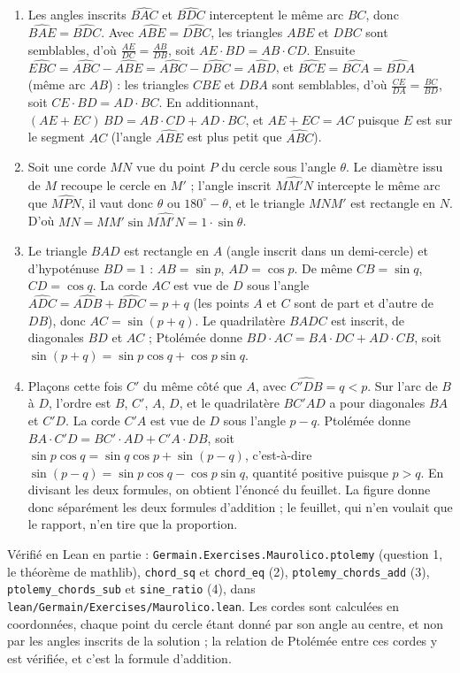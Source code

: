 \documentclass[11pt,a4paper]{article}
\begin{document}
\begin{solution}
\begin{enumerate}
\item Les angles inscrits $\widehat{BAC}$ et $\widehat{BDC}$ interceptent le même
  arc $BC$, donc $\widehat{BAE} = \widehat{BDC}$. Avec
  $\widehat{ABE} = \widehat{DBC}$, les triangles $ABE$ et $DBC$ sont semblables,
  d'où $\frac{AE}{DC} = \frac{AB}{DB}$, soit $AE \cdot BD = AB \cdot CD$. Ensuite
  $\widehat{EBC} = \widehat{ABC} - \widehat{ABE} = \widehat{ABC} - \widehat{DBC}
  = \widehat{ABD}$, et $\widehat{BCE} = \widehat{BCA} = \widehat{BDA}$ (même arc
  $AB$) : les triangles $CBE$ et $DBA$ sont semblables, d'où
  $\frac{CE}{DA} = \frac{BC}{BD}$, soit $CE \cdot BD = AD \cdot BC$. En
  additionnant, $(AE + EC)\,BD = AB \cdot CD + AD \cdot BC$, et $AE + EC = AC$
  puisque $E$ est sur le segment $AC$ (l'angle $\widehat{ABE}$ est plus petit que
  $\widehat{ABC}$).
\item Soit une corde $MN$ vue du point $P$ du cercle sous l'angle $\theta$. Le
  diamètre issu de $M$ recoupe le cercle en $M'$ ; l'angle inscrit
  $\widehat{MM'N}$ intercepte le même arc que $\widehat{MPN}$, il vaut donc
  $\theta$ ou $180^\circ - \theta$, et le triangle $MNM'$ est rectangle en $N$.
  D'où $MN = MM' \sin\widehat{MM'N} = 1 \cdot \sin\theta$.
\item Le triangle $BAD$ est rectangle en $A$ (angle inscrit dans un demi-cercle)
  et d'hypoténuse $BD = 1$ : $AB = \sin p$, $AD = \cos p$. De même
  $CB = \sin q$, $CD = \cos q$. La corde $AC$ est vue de $D$ sous l'angle
  $\widehat{ADC} = \widehat{ADB} + \widehat{BDC} = p + q$ (les points $A$ et $C$
  sont de part et d'autre de $DB$), donc $AC = \sin(p+q)$. Le quadrilatère
  $BADC$ est inscrit, de diagonales $BD$ et $AC$ ; Ptolémée donne
  $BD \cdot AC = BA \cdot DC + AD \cdot CB$, soit
  $\sin(p+q) = \sin p \cos q + \cos p \sin q$.
\item Plaçons cette fois $C'$ du même côté que $A$, avec $\widehat{C'DB} = q < p$.
  Sur l'arc de $B$ à $D$, l'ordre est $B$, $C'$, $A$, $D$, et le quadrilatère
  $BC'AD$ a pour diagonales $BA$ et $C'D$. La corde $C'A$ est vue de $D$ sous
  l'angle $p - q$. Ptolémée donne $BA \cdot C'D = BC' \cdot AD + C'A \cdot DB$,
  soit $\sin p \cos q = \sin q \cos p + \sin(p-q)$, c'est-à-dire
  $\sin(p-q) = \sin p\cos q - \cos p \sin q$, quantité positive puisque $p > q$.
  En divisant les deux formules, on obtient l'énoncé du feuillet. La figure donne
  donc séparément les deux formules d'addition ; le feuillet, qui n'en voulait
  que le rapport, n'en tire que la proportion.
\end{enumerate}

Vérifié en Lean en partie : \texttt{Germain.Exercises.Maurolico.ptolemy} (question 1, le
théorème de mathlib), \texttt{chord\_sq} et \texttt{chord\_eq} (2), \texttt{ptolemy\_chords\_add}
(3), \texttt{ptolemy\_chords\_sub} et \texttt{sine\_ratio} (4), dans \texttt{lean/Germain/Exercises/Maurolico.lean}. Les
cordes sont calculées en coordonnées, chaque point du cercle étant donné par son angle au
centre, et non par les angles inscrits de la solution ; la relation de Ptolémée entre ces
cordes y est vérifiée, et c'est la formule d'addition.
\end{solution}
\end{document}
